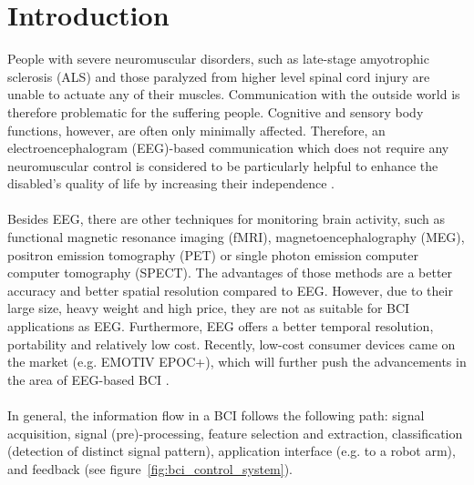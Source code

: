 \documentclass[a4paper,twoside, openright,12pt]{report}
\begin{document}
\chapter{Introduction}
People with severe neuromuscular disorders, such as late-stage amyotrophic sclerosis (ALS) and those paralyzed from higher level spinal cord injury are unable to actuate any of their muscles. Communication with the outside world is therefore problematic for the suffering people. Cognitive and sensory body functions, however, are often only minimally affected. Therefore, an electroencephalogram (EEG)-based communication which does not require any neuromuscular control is considered to be particularly helpful to enhance the disabled's quality of life by increasing their independence \cite{birbaumer2006brain}.\\\\
Besides EEG, there are other techniques for monitoring brain activity, such as functional magnetic resonance imaging (fMRI), magnetoencephalography (MEG), positron emission tomography (PET) or single photon emission computer computer tomography (SPECT). The advantages of those methods are a better accuracy and better spatial resolution compared to EEG. However, due to their large size, heavy weight and high price, they are not as suitable for BCI applications as EEG. Furthermore, EEG offers a better temporal resolution, portability and relatively low cost. Recently, low-cost consumer devices came on the market (e.g. EMOTIV EPOC+), which will further push the advancements in the area of EEG-based BCI \cite{sivakamianalysis}. \\\\
In general, the information flow in a BCI follows the following path: signal acquisition, signal (pre)-processing, feature selection and extraction, classification (detection of distinct signal pattern), application interface (e.g. to a robot arm), and feedback (see figure~\ref{fig:bci_control_system}). 
\end{document}
